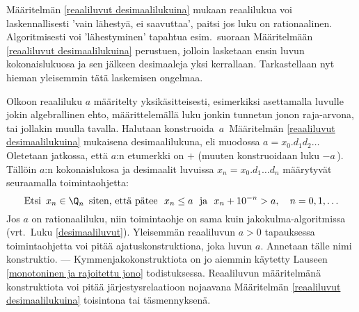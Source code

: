 Määritelmän \ref{reaaliluvut desimaalilukuina} mukaan reaalilukua voi laskennallisesti 
'vain lähestyä, ei saavuttaa', paitsi jos luku on rationaalinen. Algoritmisesti voi 
'lähestyminen' tapahtua esim.\ suoraan Määritelmään \ref{reaaliluvut desimaalilukuina} 
perustuen, jolloin lasketaan ensin luvun kokonaislukuosa ja sen jälkeen desimaaleja yksi
kerrallaan. Tarkastellaan nyt hieman yleisemmin tätä laskemisen ongelmaa.

Olkoon reaaliluku $a$ määritelty yksikäsitteisesti, esimerkiksi asettamalla luvulle jokin 
algebrallinen ehto, määrittelemällä luku jonkin tunnetun jonon raja-arvona, tai jollakin
muulla tavalla. Halutaan konstruoida $\,a\,$ Määritelmän \ref{reaaliluvut desimaalilukuina}
mukaisena desimaalilukuna, eli muodossa $a = x_0.d_1 d_2\ldots$  Oletetaan jatkossa, että $a$:n
etumerkki on $+$ (muuten konstruoidaan luku $-a\,$). Tällöin $a$:n kokonaislukosa ja desimaalit
luvuissa $x_n=x_0.d_1 \ldots d_n$ määrytyvät seuraamalla toimintaohjetta:
\[
\text{Etsi $\,x_n\in\Q_n\,$ siten, että pätee}\ \ x_n \le a\ \ 
                            \text{ja}\ \ x_n + 10^{-n} > a, \quad n = 0,1, \ldots
\]
Jos $a$ on rationaaliluku, niin toimintaohje on sama kuin jakokulma-algoritmissa (vrt.\ Luku 
\ref{desimaaliluvut}). Yleisemmän reaaliluvun $a>0$ tapauksessa toimintaohjetta voi pitää
ajatuskonstruktiona, joka \pain{määrittelee} luvun $a$. Annetaan tälle nimi
\kor{kymmenjako}konstruktio. --- Kymmenjakokonstruktiota on jo aiemmin käytetty Lauseen
\ref{monotoninen ja rajoitettu jono} todistuksessa. Reaaliluvun määritelmänä 
konstruktiota voi pitää järjestysrelaatioon nojaavana Määritelmän
\ref{reaaliluvut desimaalilukuina} toisintona tai täsmennyksenä.

